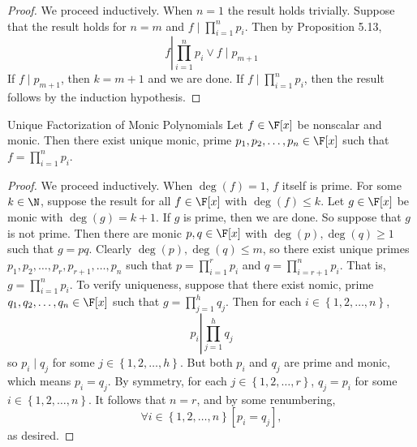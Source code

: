 \documentclass[linearalgebra]{subfiles}
\begin{document}
    \begin{proof}
        We proceed inductively. When $n=1$ the result holds trivially. Suppose that the result holds for $n=m$ and $f\mid \prod^n_{i=1} p_i$. Then by Proposition 5.13,
        \begin{equation*}
            f\left|\prod^n_{i=1} p_i \lor f\mid p_{m+1}\right.
        \end{equation*}
        If $f\mid p_{m+1}$, then $k=m+1$ and we are done. If $f\mid\prod^n_{i=1} p_i$, then the result follows by the induction hypothesis.
    \end{proof}

    \clearpage
    \begin{theorem}{Unique Factorization of Monic Polynomials}
        Let $f\in \F[x]$ be nonscalar and monic. Then there exist unique monic, prime $p_1, p_2, \ldots, p_n\in \F[x]$ such that $f = \prod^n_{i=1} p_i$.
    \end{theorem}

    \begin{proof}
        We proceed inductively. When $\deg(f)=1$, $f$ itself is prime. For some $k\in \N$, suppose the result for all $f\in \F[x]$ with $\deg(f)\leq k$. Let $g\in \F[x]$ be monic with $\deg(g) = k+1$. If $g$ is prime, then we are done. So suppose that $g$ is not prime. Then there are monic $p, q\in \F[x]$ with $\deg(p),\deg(q)\geq 1$ such that $g=pq$. Clearly $\deg(p), \deg(q)\leq m$, so there exist unique primes $p_1, p_2, \ldots, p_r, p_{r+1}, \ldots, p_n$ such that $p =
        \prod^{r}_{i=1} p_i$ and $q = \prod^{n}_{i=r+1} p_i$. That is, $g = \prod^{n}_{i=1} p_i$. To verify uniqueness, suppose that there exist nomic, prime $q_1, q_2, \ldots, q_n\in \F[x]$ such that $g = \prod^{h}_{j=1} q_j$. Then for each $i\in \left\lbrace 1, 2, \ldots, n \right\rbrace$,
        \begin{equation*}
            p_i \left| \prod^{h}_{j=1} q_j\right. 
        \end{equation*}
        so $p_i\mid q_j$ for some $j\in \left\lbrace 1, 2, \ldots, h \right\rbrace$. But both $p_i$ and $q_j$ are prime and monic, which means $p_i = q_j$. By symmetry, for each $j\in \left\lbrace 1, 2, \ldots, r \right\rbrace$, $q_j = p_i$ for some $i\in \left\lbrace 1, 2, \ldots, n \right\rbrace$. It follows that $n = r$, and by some renumbering,
        \begin{equation*}
            \forall i\in \left\lbrace 1, 2, \ldots, n \right\rbrace \left[ p_i = q_j \right],
        \end{equation*}
        as desired.
    \end{proof}
\end{document}
